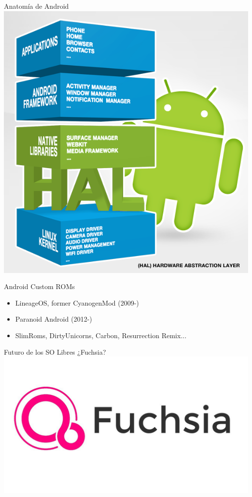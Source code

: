 \begin{frame}{Anatomía de Android}
    \centering
    \includegraphics[height=0.7\textheight]{images/android-arch-2.png}
\end{frame}

\begin{frame}{Android Custom ROMs}
    \begin{itemize}
        \item LineageOS, former CyanogenMod (2009-)
        \item Paranoid Android (2012-)
        \item SlimRoms, DirtyUnicorns, Carbon, Resurrection Remix...
    \end{itemize}
\end{frame}

\begin{frame}{Futuro de los SO Libres}
    \centering
    \Huge{¿Fuchsia?}
    \includegraphics[width=\textwidth]{images/fuchsia.png}
\end{frame}

